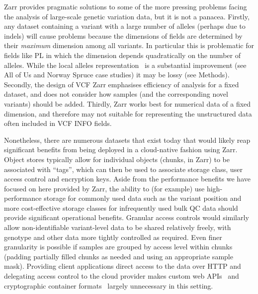 \documentclass[a4paper,num-refs]{oup-contemporary}
\begin{document}
Zarr provides pragmatic solutions to some of the more pressing
problems facing the analysis of large-scale genetic variation
data, but it is not a panacea. Firstly,
any dataset containing a variant with a large number of alleles
(perhaps due to indels) will cause problems because the
dimensions of fields are determined by their \emph{maximum}
dimension among all variants. In particular this is problematic
for fields like PL in which the dimension depends
quadratically on the number of alleles.
While the local alleles representation~\cite{poterba2024scalable}
is a substantial improvement (see All of Us and Norway Spruce
case studies) it may be lossy (see Methods). 
Secondly, the design of
VCF Zarr emphasises efficiency of analysis for a fixed
dataset, and does not consider how samples (and the
corresponding novel variants) should be added.
Thirdly, Zarr works best for numerical data of a fixed
dimension, and therefore may not suitable for representing
the unstructured data often included in VCF INFO fields.

Nonetheless, there are numerous datasets that exist today
that would likely reap significant benefits from being deployed
in a cloud-native fashion using Zarr. Object
stores typically allow for individual objects (chunks, in
Zarr) to be associated with ``tags'', which can then be
used to associate storage class, user access control
and encryption keys.
Aside from the performance benefits
we have focused on here provided by Zarr, the ability
to (for example) use high-performance storage for commonly
used data such as the variant position and
more cost-effective storage classes
for infrequently used bulk QC data should provide
significant operational benefits.
Granular access controls would similarly allow non-identifiable
variant-level data to be shared relatively freely,
with genotype and other data more tightly controlled
as required.
Even finer granularity is possible if samples are grouped by
access level within chunks (padding partially filled
chunks as needed and using an appropriate sample mask).
Providing client applications direct access to
the data over HTTP
and delegating access control to the cloud provider
makes custom web APIs~\cite{kelleher2019htsget}
and cryptographic container formats~\citep{senf2021crypt4gh}
largely unnecessary in this setting.
\end{document}
